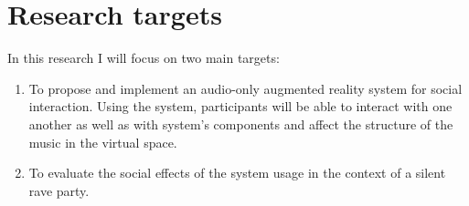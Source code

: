 \section{Research targets}

In this research I will focus on two main targets:
\begin{enumerate}
	\item To propose and implement an audio-only augmented reality system for social interaction. Using the system, participants will be able to interact with one another as well as with system's components and affect the structure of the music in the virtual space.
	\item To evaluate the social effects of the system usage in the context of a silent rave party.
\end{enumerate}